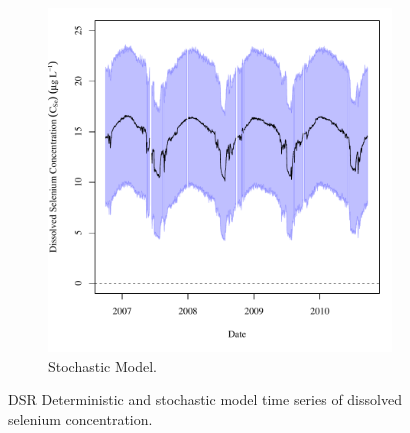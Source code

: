 \begin{linenumbers}
\begin{landscape}
\begin{figure}
\begin{subfigure}{0.7\textwidth}
			\includegraphics[width=\tableCustomSize]{"Figures/Results_DSR/Stochastic/c TS D106C"}
			\caption{Stochastic Model.}
		\end{subfigure}
		\caption{DSR Deterministic and stochastic model time series of dissolved selenium concentration.}
	\end{figure}
\end{landscape}


\end{linenumbers}
